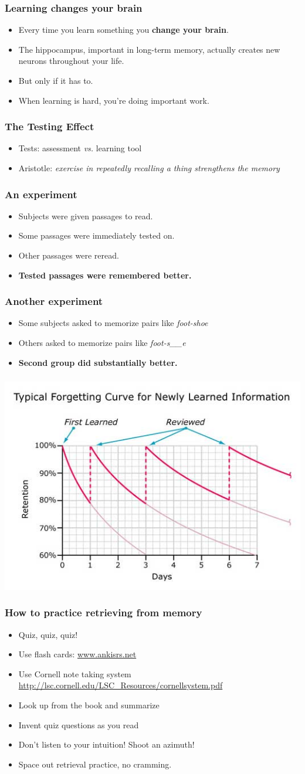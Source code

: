 \documentclass{beamer}
\newcommand{\bi}{\begin{itemize}}
\newcommand{\li}{\item}
\newcommand{\ei}{\end{itemize}}
\newcommand{\bfr}[1]{\begin{frame}[fragile]\frametitle{{ #1 }}}
\begin{document}
\bfr{Learning changes your brain}
\bi
\li Every time you learn something you {\bf change your brain}.
\li The hippocampus, important in
long-term memory, actually creates new neurons throughout your life.
\li But only if it has to.
\li When learning is hard, you're doing important work.
\ei
\end{frame}

\bfr{The Testing Effect}
\bi
\li Tests: assessment {\em vs.} learning tool
\li Aristotle:  {\em exercise in repeatedly recalling a thing
strengthens the memory}
\ei
\end{frame}

\bfr{An experiment}
\bi
\li Subjects were given passages to read.
\li Some passages were immediately tested on.
\li Other passages were reread.
\li {\bf Tested passages were remembered better.}
\ei
\end{frame}

\bfr{Another experiment}
\bi
\li Some subjects asked to memorize pairs like {\em foot-shoe}
\li Others asked to memorize pairs like {\em foot-s\_\_e}
\li {\bf Second group did substantially better.}
\ei
\end{frame}
\bfr{}
\centerline{\huge{}}
\end{frame}

\bfr{}
\begin{center}
\includegraphics[width=\textwidth]{ForgettingCurve.jpg}
\end{center}
\end{frame}


\bfr{How to practice retrieving from memory}
\bi
\li Quiz, quiz, quiz!
\li Use flash cards: \url{www.ankisrs.net}
\li Use Cornell note taking system \\\url{http://lsc.cornell.edu/LSC_Resources/cornellsystem.pdf}
\li Look up from the book and summarize
\li Invent quiz questions as you read
\ei
\bi
\li Don't listen to your intuition!  Shoot an azimuth!
\li Space out retrieval practice, no cramming.
\ei
\end{frame}
\end{document}
